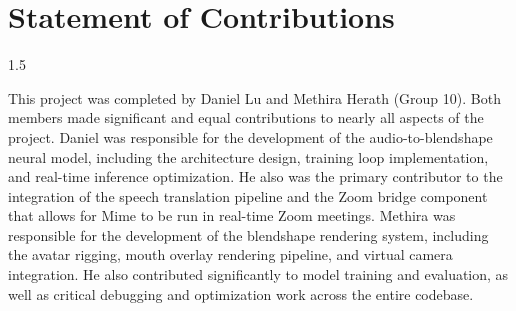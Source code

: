 
\renewcommand{\baselinestretch}{1}\selectfont
\renewcommand\contentsname{Table of Contents}
\tableofcontents
\cleardoublepage
{}    %

\chapter*{Statement of Contributions}
\thispagestyle{plain}

\begingroup
\setlength{\parindent}{0pt}
\setlength{\parskip}{0.75\baselineskip}
\begin{spacing}{1.5}
\begin{center}


This project was completed by Daniel Lu and Methira Herath (Group 10). 
Both members made significant and equal contributions to nearly all aspects of the project.
\newline \newline
Daniel was responsible for the development of the audio-to-blendshape neural model, including the architecture design, training loop implementation, and real-time inference optimization. He also was the primary contributor to the integration of the speech translation pipeline and the Zoom bridge component that allows for Mime to be run in real-time Zoom meetings.
\newline \newline
Methira was responsible for the development of the blendshape rendering system, including the avatar rigging, mouth overlay rendering pipeline, and virtual camera integration. He also contributed significantly to model training and evaluation, as well as critical debugging and optimization work across the entire codebase.

\end{center}

\end{spacing}
\endgroup

\cleardoublepage
{}    %


\setcounter{page}{1}